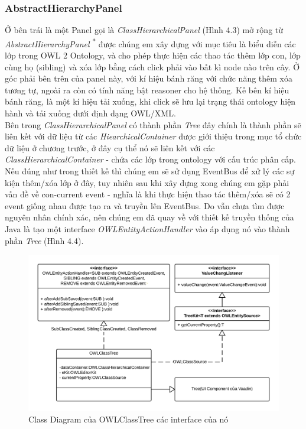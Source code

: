 \subsubsection{AbstractHierarchyPanel}
Ở bên trái là một Panel gọi là \textit{ClassHierarchicalPanel} (Hình 4.3) mở rộng từ \textit{AbstractHierarchyPanel} \textsuperscript{*} được chúng em xây dựng với mục tiêu là biểu diễn các lớp trong OWL 2 Ontology, và cho phép thực hiện các thao tác thêm lớp con, lớp cùng họ (sibling) và xóa lớp bằng cách click phải vào bất kì node nào trên cây. Ở góc phải bên trên của panel này, với kí hiệu bánh răng với chức năng thêm xóa tương tự, ngoài ra còn có tính năng bật reasoner cho hệ thống. Kế bên kí hiệu bánh răng, là một kí hiệu tải xuống, khi click sẽ lưu lại trạng thái ontology hiện hành và tải xuống dưới định dạng OWL/XML.
\\
Bên trong \textit{ClassHierarchicalPanel} có thành phần \textit{Tree} đây chính là thành phần sẽ liên kết với dữ liệu từ các \textit{HiearchicalContainer} được giới thiệu trong mục tổ chức dữ liệu ở chương trước, ở đây cụ thể nó sẽ liên kết với các \textit{ClassHierarchicalContainer} - chứa các lớp trong ontology với cấu trúc phân cấp. Nếu đúng như trong thiết kế thì chúng em sẽ sử dụng EventBus để xử lý các sự kiện thêm/xóa lớp ở đây, tuy nhiên sau khi xây dựng xong chúng em gặp phải vấn đề về con-current event - nghĩa là khi thực hiện thao tác thêm/xóa sẽ có 2 event giống nhau được tạo ra và truyền lên EventBus. Do vẫn chưa tìm được nguyên nhân chính xác, nên chúng em đã quay về với thiết kế truyền thống của Java là tạo một interface \textit{OWLEntityActionHandler} vào áp dụng nó vào thành phần \textit{Tree} (Hình 4.4).
\begin{figure}[h!]
	\centering
	\includegraphics[width=155mm]{Figures/uml_owlclasstree.png}
	\caption{Class Diagram của OWLClassTree các interface của nó \label{overflow}}
\end{figure}
